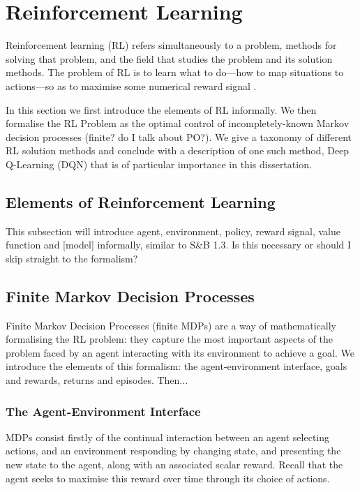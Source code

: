 \documentclass[11pt, a4paper, bibliography=totoc]{report}
\begin{document}
\chapter{Reinforcement Learning}
Reinforcement learning (RL) refers simultaneously to a problem, methods for solving that problem, and the field that studies the problem and its solution methods. The problem of RL is to learn what to do---how to map situations to actions---so as to maximise some numerical reward signal \cite[pp.~1-2]{Sutton2018}.

In this section we first introduce the elements of RL informally. We then formalise the RL Problem as the optimal control of incompletely-known Markov decision processes (finite? do I talk about PO?). We give a taxonomy of different RL solution methods and conclude with a description of one such method, Deep Q-Learning (DQN) that is of particular importance in this dissertation.

\section{Elements of Reinforcement Learning}
This subsection will introduce agent, environment, policy, reward signal, value function and [model] informally, similar to S\&B 1.3. Is this necessary or should I skip straight to the formalism?

\section{Finite Markov Decision Processes}
Finite Markov Decision Processes (finite MDPs) are a way of mathematically formalising the RL problem: they capture the most important aspects of the problem faced by an agent interacting with its environment to achieve a goal. We introduce the elements of this formalism: the agent-environment interface, goals and rewards, returns and episodes. Then...

\subsection{The Agent-Environment Interface} \label{subsection:agent_env_interface}
MDPs consist firstly of the continual interaction between an agent selecting actions, and an environment responding by changing state, and presenting the new state to the agent, along with an associated scalar reward. Recall that the agent seeks to maximise this reward over time through its choice of actions.
\end{document}
